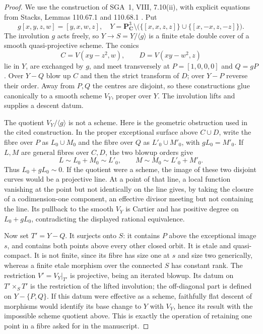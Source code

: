 \begin{proof}
We use the construction of SGA~1, VIII, 7.10(ii), with explicit equations
from Stacks, Lemmas 110.67.1 and 110.68.1
\cite{SGA1VIII7,Stacks08J1,Stacks08KF}. Put
\[
 g[x,y,z,w]=[y,x,w,z],\quad
 Y=\mathbf P^3_{\mathbf C}\setminus
 \bigl(\{[x,x,z,z]\}\cup\{[x,-x,z,-z]\}\bigr).
\]
The involution $g$ acts freely, so $Y\to S=Y/\langle g\rangle$ is a
finite etale double cover of a smooth quasi-projective scheme.
The conics
\[
 C=V(xy-z^2,w),\qquad D=V(xy-w^2,z)
\]
lie in $Y$, are exchanged by $g$, and meet transversely at
$P=[1,0,0,0]$ and $Q=gP$. Over $Y-Q$ blow up $C$ and then the strict
transform of $D$; over $Y-P$ reverse their order. Away from $P,Q$ the
centres are disjoint, so these constructions glue canonically to a
smooth scheme $V_Y$, proper over $Y$. The involution lifts and supplies
a descent datum.

The quotient $V_Y/\langle g\rangle$ is not a scheme. Here is the
geometric obstruction used in the cited construction. In the proper
exceptional surface above $C\cup D$, write the fibre over $P$ as
$L_0\cup M_0$ and the fibre over $Q$ as $L'_0\cup M'_0$, with
$gL_0=M'_0$. If $L,M$ are general fibres over $C,D$, the two blowup
orders give
\[
 L\sim L_0+M_0\sim L'_0,\qquad
 M\sim M_0\sim L'_0+M'_0.
\]
Thus $L_0+gL_0\sim0$. If the quotient were a scheme, the image of
these two disjoint curves would be a projective line. At a point of
that line, a local function vanishing at the point but not identically
on the line gives, by taking the closure of a codimension-one component,
an effective divisor meeting but not containing the line. Its pullback
to the smooth $V_Y$ is Cartier and has positive degree on
$L_0+gL_0$, contradicting the displayed rational equivalence.

Now set $T'=Y-Q$. It surjects onto $S$: it contains $P$ above the
exceptional image $s$, and contains both points above every other
closed orbit. It is etale and quasi-compact. It is not finite, since
its fibre has size one at $s$ and size two generically, whereas a finite
etale morphism over the connected $S$ has constant rank. The restriction
$V'=V_Y|_{T'}$ is projective, being an iterated blowup. Its datum on
$T'\times_S T'$ is the restriction of the lifted involution; the
off-diagonal part is defined on $Y-\{P,Q\}$. If this datum were
effective as a scheme, faithfully flat descent of morphisms would
identify its base change to $Y$ with $V_Y$, hence its result with the
impossible scheme quotient above. This is exactly the operation of
retaining one point in a fibre asked for in the manuscript.
\end{proof}

